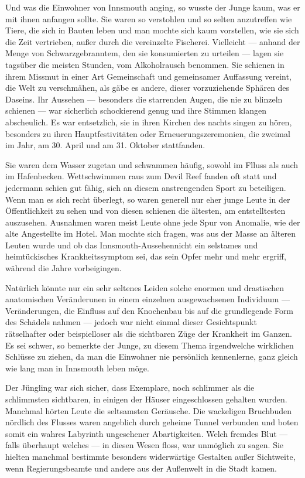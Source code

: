 Und was die Einwohner von Innsmouth anging, so wusste der Junge kaum, was er mit ihnen anfangen sollte. Sie waren so verstohlen und so selten anzutreffen wie Tiere, die sich in Bauten leben und man mochte sich kaum vorstellen, wie sie sich die Zeit vertrieben, außer durch die vereinzelte Fischerei. Vielleicht --- anhand der Menge von Schwarzgebranntem, den sie konsumierten zu urteilen --- lagen sie tagsüber die meisten Stunden, vom Alkoholrausch benommen. Sie schienen in ihrem Missmut in einer Art Gemeinschaft und gemeinsamer Auffassung vereint, die Welt zu verschmähen, als gäbe es andere, dieser vorzuziehende Sphären des Daseins. Ihr Aussehen --- besonders die starrenden Augen, die nie zu blinzeln schienen --- war sicherlich schockierend genug und ihre Stimmen klangen abscheulich. Es war entsetzlich, sie in ihren Kirchen des nachts singen zu hören, besonders zu ihren Hauptfestivitäten oder Erneuerungszeremonien, die zweimal im Jahr, am 30. April und am 31. Oktober stattfanden.

Sie waren dem Wasser zugetan und schwammen häufig, sowohl im Flluss als auch im Hafenbecken. Wettschwimmen raus zum Devil Reef fanden oft statt und jedermann schien gut fähig, sich an diesem anstrengenden Sport zu beteiligen. Wenn man es sich recht überlegt, so waren generell nur eher junge Leute in der Öffentlichkeit zu sehen und von diesen schienen die ältesten, am entstelltesten auszusehen. Ausnahmen waren meist Leute ohne jede Spur von Anomalie, wie der alte Angestellte im Hotel. Man mochte sich fragen, was aus der Masse an älteren Leuten wurde und ob das \glqq Innsmouth-Aussehen\grqq nicht ein selstames und heimtückisches Krankheitssymptom sei, das sein Opfer mehr und mehr ergriff, während die Jahre vorbeigingen.

Natürlich könnte nur ein sehr seltenes Leiden solche enormen und drastischen anatomischen Veränderunen in einem einzelnen ausgewachsenen Individuum --- Veränderungen, die Einfluss auf den Knochenbau bis auf die grundlegende Form des Schädels nahmen --- jedoch war nicht einmal dieser Gesichtspunkt rätselhafter oder beispielloser als die sichtbaren Züge der Krankheit im Ganzen. Es sei schwer, so bemerkte der Junge, zu diesem Thema irgendwelche wirklichen Schlüsse zu ziehen, da man die Einwohner nie persönlich kennenlerne, ganz gleich wie lang man in Innsmouth leben möge. 

Der Jüngling war sich sicher, dass Exemplare, noch schlimmer als die schlimmsten sichtbaren, in einigen der  Häuser eingeschlossen gehalten wurden. Manchmal hörten Leute die seltsamsten Geräusche. Die wackeligen  Bruchbuden nördlich des Flusses waren angeblich durch geheime Tunnel verbunden und boten somit ein wahres Labyrinth ungesehener Abartigkeiten. Welch fremdes Blut --- falls überhaupt welches --- in diesen Wesen floss, war unmöglich zu sagen. Sie hielten manchmal bestimmte besonders widerwärtige Gestalten außer Sichtweite, wenn Regierungsbeamte und andere aus der Außenwelt in die Stadt kamen.

